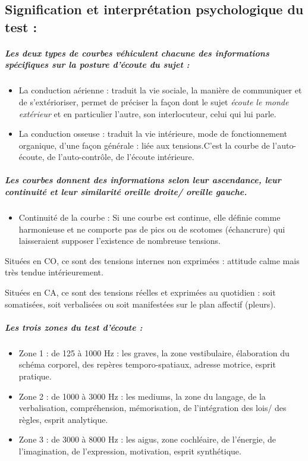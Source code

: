 \subsection{Signification et interprétation psychologique du test : }
\subparagraph{Les deux types de courbes véhiculent chacune des informations spécifiques
sur la posture d'écoute du sujet : }
\begin{itemize}
\item La conduction aérienne : traduit la vie sociale, la manière de communiquer
et de s'extérioriser, permet de préciser la façon dont le sujet\emph{
écoute le monde extérieur} et en particulier l\textquoteright autre,
son interlocuteur, celui qui lui parle. 
\item La conduction osseuse : traduit la vie intérieure, mode de fonctionnement
organique, d'une façon générale : liée aux tensions.C'est la courbe
de l\textquoteright auto-écoute, de l\textquoteright auto-contrôle,
de l'écoute intérieure.
\end{itemize}

\subparagraph{Les courbes donnent des informations selon leur ascendance, leur
continuité et leur similarité oreille droite/ oreille gauche.}
\begin{itemize}
\item Continuité de la courbe : Si une courbe est continue, elle définie
comme harmonieuse et ne comporte pas de pics ou de scotomes (échancrure)  qui laisseraient
supposer l'existence de nombreuse tensions.
\end{itemize}
Situées en CO, ce sont des tensions internes non exprimées : attitude
calme mais très tendue intérieurement.

Situées en CA, ce sont des tensions réelles et exprimées au quotidien
: soit somatisées, soit verbalisées ou soit manifestées sur le plan
affectif (pleurs).

\subparagraph{Les trois zones du test d'écoute : }
\begin{itemize}
\item Zone 1 : de 125 à 1000 Hz : les graves, la zone vestibulaire, élaboration
du schéma corporel, des repères temporo-spatiaux, adresse motrice,
esprit pratique.
\item Zone 2 : de 1000 à 3000 Hz : les mediums, la zone du langage, de la
verbalisation, compréhension, mémorisation, de l'intégration des lois/
des règles, esprit analytique.
\item Zone 3 : de 3000 à 8000 Hz : les aigus, zone cochléaire, de l'énergie,
de l'imagination, de l'expression, motivation, esprit synthétique.
\end{itemize}

